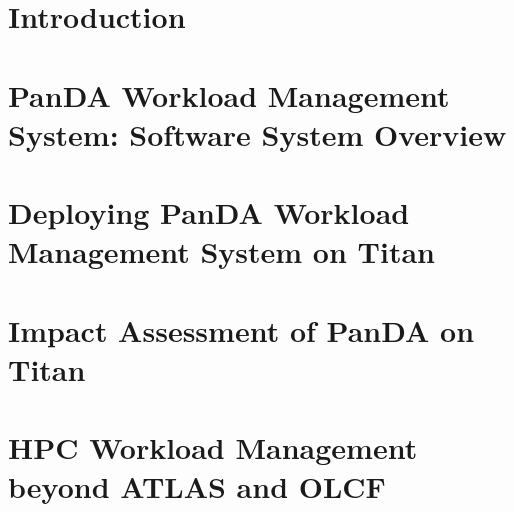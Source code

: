 \documentclass[smallextended]{svjour3}      %
\begin{document}
\section{Introduction}
\label{sec:introduction}



\section{PanDA Workload Management System: Software System Overview}
\label{sec:overview}



\section{Deploying PanDA Workload Management System on Titan}
\label{sec:deploying}



\section{Impact Assessment of PanDA on Titan}
\label{sec:impact-assessment}




\section{HPC Workload Management beyond ATLAS and OLCF}
\label{sec:beyond-atlas-and-olcf}

\end{document}
